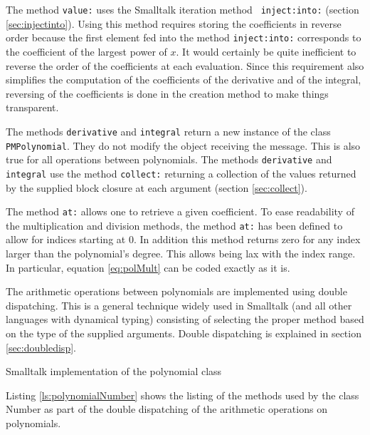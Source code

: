 \documentclass[twoside]{book}
\begin{document}
The method {\tt value:} uses the Smalltalk iteration method {\tt
inject:into:} (\cf section \ref{sec:injectinto}). Using this
method requires storing the coefficients in reverse order because
the first element fed into the method {\tt inject:into:}
corresponds to the coefficient of the largest power of $x$. It
would certainly be quite inefficient to reverse the order of the
coefficients at each evaluation. Since this requirement also
simplifies the computation of the coefficients of the derivative
and of the integral, reversing of the coefficients is done in the
creation method to make things transparent.

The methods {\tt derivative} and {\tt integral} return a new
instance of the class {\tt PMPolynomial}. They do not modify the
object receiving the message. This is also true for all operations
between polynomials. The methods {\tt derivative} and {\tt
integral} use the method {\tt collect:} returning a collection of
the values returned by the supplied block closure at each argument
(\cf section \ref{sec:collect}).

The method {\tt at:} allows one to retrieve a given coefficient.
To ease readability of the multiplication and division methods,
the method {\tt at:} has been defined to allow for indices
starting at 0. In addition this method returns zero for any index
larger than the polynomial's degree. This allows being lax with
the index range. In particular, equation \ref{eq:polMult} can be
coded exactly as it is.

The arithmetic operations between polynomials are implemented
using double dispatching. This is a general technique widely used
in Smalltalk (and all other languages with dynamical typing)
consisting of selecting the proper method based on the type of the
supplied arguments. Double dispatching is explained in section
\ref{sec:doubledisp}.


\begin{listing}
Smalltalk implementation of the polynomial class
\label{ls:polynomial}

\end{listing}

Listing \ref{ls:polynomialNumber} shows the listing of the methods
used by the class Number as part of the double dispatching of the
arithmetic operations on polynomials.
\end{document}
